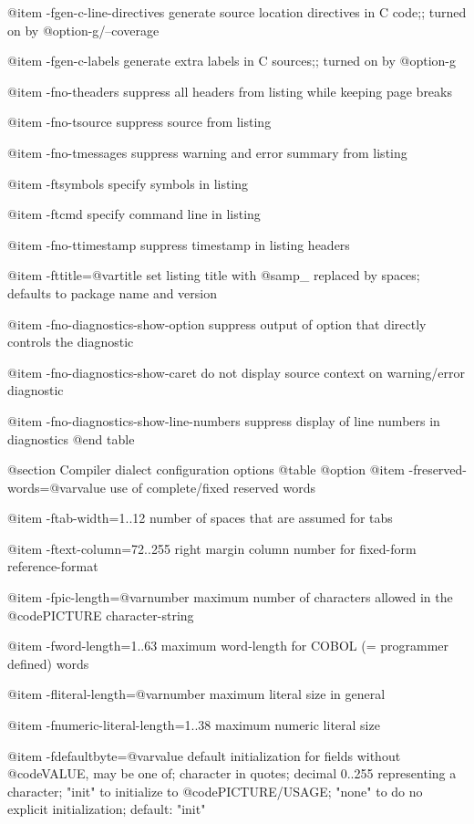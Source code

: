 @item -fgen-c-line-directives
generate source location directives in C code;; turned on by @option{-g}/--coverage

@item -fgen-c-labels
generate extra labels in C sources;; turned on by @option{-g}

@item -fno-theaders
suppress all headers from listing while keeping
page breaks

@item -fno-tsource
suppress source from listing

@item -fno-tmessages
suppress warning and error summary from listing

@item -ftsymbols
specify symbols in listing

@item -ftcmd
specify command line in listing

@item -fno-ttimestamp
suppress timestamp in listing headers

@item -fttitle=@var{title}
set listing title with @samp{_} replaced by spaces;
defaults to package name and version

@item -fno-diagnostics-show-option
suppress output of option that directly
controls the diagnostic

@item -fno-diagnostics-show-caret
do not display source context on warning/error diagnostic

@item -fno-diagnostics-show-line-numbers
suppress display of line numbers in diagnostics
@end table

@section Compiler dialect configuration options
@table @option
@item -freserved-words=@var{value}
use of complete/fixed reserved words

@item -ftab-width=1..12
number of spaces that are assumed for tabs

@item -ftext-column=72..255
right margin column number for fixed-form reference-format

@item -fpic-length=@var{number}
maximum number of characters allowed in the @code{PICTURE} character-string

@item -fword-length=1..63
maximum word-length for COBOL (= programmer defined) words

@item -fliteral-length=@var{number}
maximum literal size in general

@item -fnumeric-literal-length=1..38
maximum numeric literal size

@item -fdefaultbyte=@var{value}
default initialization for fields without @code{VALUE}, may be one of; character in quotes; decimal 0..255 representing a character; "init" to initialize to @code{PICTURE/USAGE}; "none" to do no explicit initialization; default: "init"

